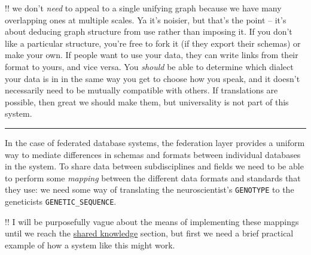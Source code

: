 \documentclass[11pt]{article}
\begin{document}
\begin{multicols}{2}
!! we don't \emph{need} to appeal to a single unifying graph because we
have many overlapping ones at multiple scales. Ya it's noisier, but
that's the point -- it's about deducing graph structure from use rather
than imposing it. If you don't like a particular structure, you're free
to fork it (if they export their schemas) or make your own. If people
want to use your data, they can write links from their format to yours,
and vice versa. You \emph{should} be able to determine which dialect
your data is in in the same way you get to choose how you speak, and it
doesn't necessarily need to be mutually compatible with others. If
translations are possible, then great we should make them, but
universality is not part of this system.

\begin{center}\rule{0.5\linewidth}{0.5pt}\end{center}

In the case of federated database systems, the federation layer provides
a uniform way to mediate differences in schemas and formats between
individual databases in the system. To share data between subdisciplines
and fields we need to be able to perform some \emph{mapping} between the
different data formats and standards that they use: we need some way of
translating the neuroscientist's \texttt{GENOTYPE} to the geneticists
\texttt{GENETIC\_SEQUENCE}.

!! I will be purposefully vague about the means of implementing these
mappings until we reach the \protect\hyperlink{shared-knowledge}{shared
knowledge} section, but first we need a brief practical example of how a
system like this might work.


\end{multicols}
\end{document}
